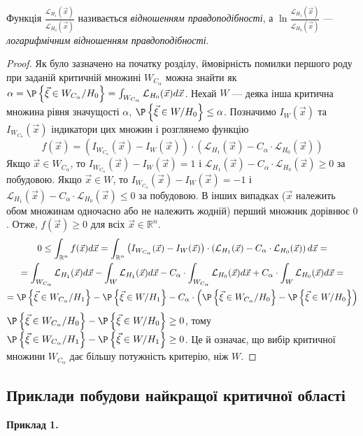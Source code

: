 \begin{remark}
    Функція $\frac{\mathcal{L}_{H_1}(\vec{x})}{\mathcal{L}_{H_0}(\vec{x})}$ називається
    \emph{відношенням правдоподібності}, а $\ln \frac{\mathcal{L}_{H_1}(\vec{x})}{\mathcal{L}_{H_0}(\vec{x})}$ ---
    \emph{логарифмічним відношенням правдоподібності}.
\end{remark}
\begin{proof}
    Як було зазначено на початку розділу, ймовірність помилки першого роду при заданій критичній множині $W_{C_\alpha}$ можна знайти як
    $\alpha = \P\left\{ \vec{\xi} \in W_{C_\alpha} / H_0\right\} = \int_{W_{C_\alpha}} \mathcal{L}_{H_0}(\vec{x}) d\vec{x}$.
    Нехай $W$ --- деяка інша критична множина рівня значущості $\alpha$, 
    $\P\left\{ \vec{\xi} \in W / H_0\right\} \leq \alpha$. Позначимо $I_W(\vec{x})$ та $I_{W_{C_\alpha}}(\vec{x})$ індикатори цих множин і
    розглянемо функцію 
    $$f(\vec{x}) = \left(I_{W_{C_\alpha}}(\vec{x}) - I_W(\vec{x})\right)\cdot \left(\mathcal{L}_{H_1}(\vec{x}) - C_{\alpha} \cdot \mathcal{L}_{H_0}(\vec{x})\right)$$
    Якщо $\vec{x} \in W_{C_\alpha}$, то $I_{W_{C_\alpha}}(\vec{x}) - I_W(\vec{x}) = 1$ і 
    $\mathcal{L}_{H_1}(\vec{x}) - C_{\alpha} \cdot \mathcal{L}_{H_0}(\vec{x}) \geq 0$ за побудовою.
    Якщо $\vec{x} \in W$, то $I_{W_{C_\alpha}}(\vec{x}) - I_W(\vec{x}) = -1$ і 
    $\mathcal{L}_{H_1}(\vec{x}) - C_{\alpha} \cdot \mathcal{L}_{H_0}(\vec{x}) \leq 0$ за побудовою.
    В інших випадках ($\vec{x}$ належить обом множинам одночасно або не належить жодній) перший множник дорівнює $0$.
    Отже, $f(\vec{x}) \geq 0$ для всіх $\vec{x} \in \mathbb{R}^n$.
    \begin{gather*}
        0 \leq \int_{\mathbb{R}^n} f(\vec{x}) d\vec{x} = 
        \int_{\mathbb{R}^n} \left(I_{W_{C_\alpha}}(\vec{x}) - I_W(\vec{x})\right)\cdot \left(\mathcal{L}_{H_1}(\vec{x}) - C_{\alpha} \cdot \mathcal{L}_{H_0}(\vec{x})\right) d\vec{x} =\\
        = \int_{W_{C_\alpha}} \mathcal{L}_{H_1}(\vec{x}) d\vec{x} - \int_{W} \mathcal{L}_{H_1}(\vec{x}) d\vec{x}
        - C_{\alpha} \cdot \int_{W_{C_\alpha}} \mathcal{L}_{H_0}(\vec{x}) d\vec{x} +
        C_{\alpha} \cdot \int_{W} \mathcal{L}_{H_0}(\vec{x}) d\vec{x} = \\
        = \P\left\{ \vec{\xi} \in W_{C_\alpha} / H_1\right\} - \P\left\{ \vec{\xi} \in W / H_1\right\} -
        C_{\alpha}\cdot\left(\P\left\{ \vec{\xi} \in W_{C_\alpha} / H_0\right\} - \P\left\{ \vec{\xi} \in W / H_0\right\}\right)
    \end{gather*}
    $\P\left\{ \vec{\xi} \in W_{C_\alpha} / H_0\right\} - \P\left\{ \vec{\xi} \in W / H_0\right\} \geq 0$, тому
    $\P\left\{ \vec{\xi} \in W_{C_\alpha} / H_1\right\} - \P\left\{ \vec{\xi} \in W / H_1\right\} \geq 0$. 
    Це й означає, що вибір критичної множини $W_{C_\alpha}$ дає більшу потужність критерію, ніж $W$.
\end{proof}

\subsection{Приклади побудови найкращої критичної області}
\noindent\textbf{Приклад 1.}